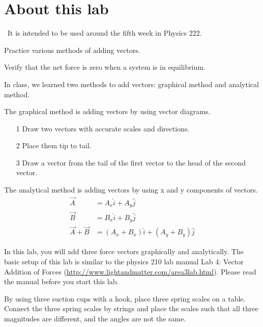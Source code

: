 \renewcommand\thechapter{c1.5}
\label{lab:covid-vector-addition}


\section*{About this lab}

\covid\ 
It is intended to be used around the fifth week in Physics 222.

\apparatus
{}

\begin{goals}

\item[] Practice various methods of adding vectors.

\item[] Verify that the net force is zero when a system is in equilibrium. 

\end{goals}

\introduction
In class, we learned two methods to add vectors: graphical method and analytical method. 

The graphical method is adding vectors by using vector diagrams. 
\begin{itemize}
\item[1]Draw two vectors with accurate scales and directions. 
\item[2]Place them tip to tail. 
\item[3]Draw a vector from the tail of the first vector to the head of the second vector.   
\end{itemize}


The analytical method is adding vectors by using x and y components of vectors.
\begin{align*}
\vec{A} &= A_x \hat{i}+A_y \hat{j} \\
\vec{B} &= B_x \hat{i}+B_y \hat{j} \\
\vec{A} +\vec{B} &= (A_x+B_x) \hat{i}+(A_y+B_y) \hat{j}
\end{align*}

In this lab, you will add three force vectors graphically and analytically. 
\observations 
The basic setup of this lab is similar to the physics 210 lab manual Lab 4: Vector Addition of Forces (\url{http://www.lightandmatter.com/area3lab.html}). Please read the manual before you start this lab. 

By using three suction cups with a hook, place three spring scales on a table. Connect the three spring scales by strings and place the scales such that all three magnitudes are different, and the angles are not the same. 

